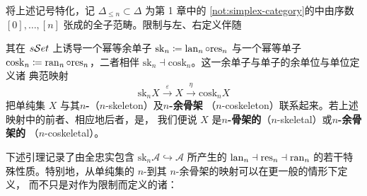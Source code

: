 \begin{definition}\label{def:simplex-skeleton-coskeleton}
将上述记号特化，记 $\Delta_{\le n}\subset\Delta$ 为第 1 章中的%
\cref{not:simplex-category}的\trSimplexCategory{}中由序数
$[0],\ldots,[n]$ 张成的全子范畴。限制与左、右\trKanExtension{}定义伴随
\begin{center}
\end{center}
其在 $s\mathcal{S}et$ 上诱导一个幂等余单子
$\mathrm{sk}_n\coloneqq\operatorname{lan}_n\circ\mathrm{res}_n$ 与一个幂等单子
$\mathrm{cosk}_n\coloneqq\operatorname{ran}_n\circ\mathrm{res}_n$，二者相伴
$\mathrm{sk}_n\dashv\mathrm{cosk}_n$。这一余单子与单子的余单位与单位定义诸%
典范映射
\[
\mathrm{sk}_n X\xrightarrow{\;\varepsilon\;}X\xrightarrow{\;\eta\;}
\mathrm{cosk}_n X
\]
把单纯集 $X$ 与其\textbf{$n$-\trSkeleton}（$n$-skeleton）及\textbf{$n$-余骨架}
（$n$-coskeleton）联系起来。若上述映射中的前者、相应地后者，是\trIsomorphism，
我们便说 $X$ 是\textbf{$n$-骨架的}（$n$-skeletal）或\textbf{$n$-余骨架的}
（$n$-coskeletal）。
\end{definition}
下述引理记录了由全忠实包含
$\mathrm{sk}_n\mathcal{A}\hookrightarrow\mathcal{A}$ 所产生的\trAdjointTriple{}
$\operatorname{lan}_n\dashv\mathrm{res}_n\dashv\operatorname{ran}_n$ 的若干特殊性质。特别地，从单纯集的
$n$-\trSkeleton{}到其 $n$-余骨架的\trCanonical{}映射可以在更一般的情形下定义，
而不只是对作为限制而定义的诸\trDiagram：

